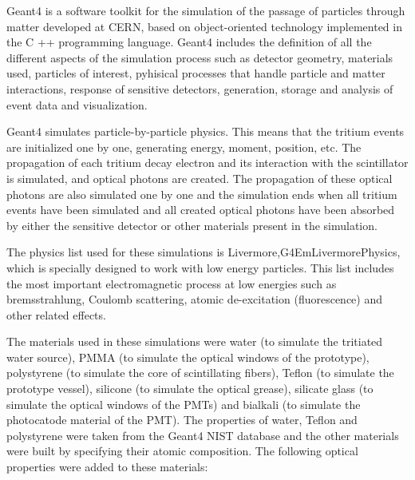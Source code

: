 Geant4 is a software toolkit for the simulation of the passage of particles through matter developed at CERN, based on object-oriented technology implemented in the C ++ programming language. Geant4 includes the definition of all the different aspects of the simulation process such as detector geometry, materials used, particles of interest, pyhisical processes that handle particle and matter interactions, response of sensitive detectors, generation, storage and analysis of event data and visualization.

Geant4 simulates particle-by-particle physics. This means that the tritium events are initialized one by one, generating energy, moment, position, etc. The propagation of each tritium decay electron and its interaction  with the scintillator is simulated, and optical photons are created. The propagation of these optical photons are also simulated one by one and the simulation ends when all tritium events have been simulated and all created optical photons have been absorbed by either the sensitive detector or other materials present in the simulation. 

The physics list used for these simulations is Livermore,\newline G4EmLivermorePhysics, which is specially designed to work with low energy particles. This list includes the most important electromagnetic process at low energies such as bremsstrahlung, Coulomb scattering, atomic de-excitation (fluorescence) and other related effects. 

The materials used in these simulations were water (to simulate the tritiated water source), PMMA (to simulate the optical windows of the prototype), polystyrene (to simulate the core of scintillating fibers), Teflon (to simulate the prototype vessel), silicone (to simulate the optical grease), silicate glass (to simulate the optical windows of the PMTs) and bialkali (to simulate the photocatode material of the PMT). The properties of water, Teflon and polystyrene were taken from the Geant4 NIST database and the other materials were built by specifying their atomic composition. The following optical properties were added to these materials:

